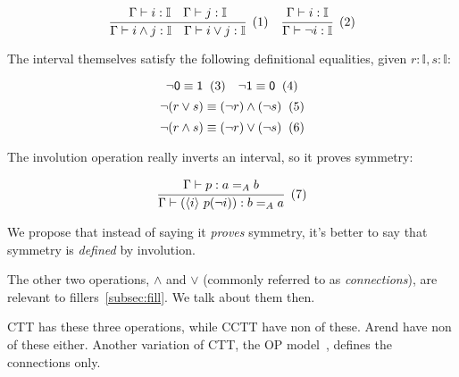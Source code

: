 \[
  \cfrac{
    \Gamma \vdash i : \mathbb I
    \quad
    \Gamma \vdash j : \mathbb I
  }{
    \Gamma \vdash i \wedge j : \mathbb I
    \quad
    \Gamma \vdash i \vee j : \mathbb I
  }
  \xtag
  \quad
  \cfrac{
    \Gamma \vdash i : \mathbb I
  }{
    \Gamma \vdash \neg i : \mathbb I
  }
  \xtag
\]

The interval themselves satisfy the following definitional equalities,
given $r : \mathbb I, s : \mathbb I$:

\[
  \neg \textsf 0 \equiv \textsf 1 \xtag \quad
  \neg \textsf 1 \equiv \textsf 0 \xtag
\]
\[
  \neg (r \vee s) \equiv (\neg r) \wedge (\neg s) \xtag
\]
\[
  \neg (r \wedge s) \equiv (\neg r) \vee (\neg s) \xtag
\]

The involution operation really inverts an interval, so it proves symmetry:

\[
  \cfrac{
    \Gamma \vdash p : a =_A b
  }{
    \Gamma \vdash (\lrangle i\ p (\neg i)) : b =_A a
  } \xtag
\]

We propose that instead of saying it \textit{proves} symmetry,
it's better to say that symmetry is \textit{defined} by involution.

The other two operations, $\wedge$ and $\vee$
(commonly referred to as \textit{connections}),
are relevant to fillers~\cref{subsec:fill}.
We talk about them then.

CTT has these three operations, while CCTT have non of these.
Arend have non of these either.
Another variation of CTT,
the OP model~\cite{OPModel}, defines the connections only.

